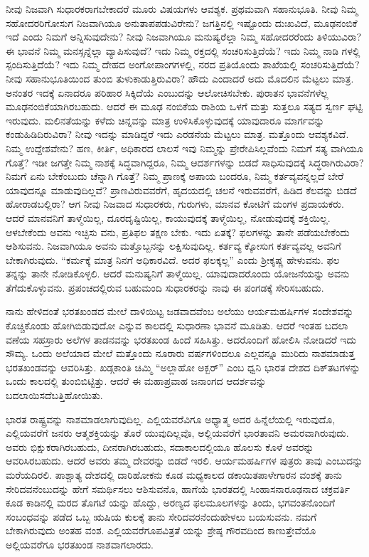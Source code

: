 ನೀವು ನಿಜವಾಗಿ ಸುಧಾರಕರಾಗಬೇಕಾದರೆ ಮೂರು ವಿಷಯಗಳು ಆವಶ್ಯಕ. ಪ್ರಥಮವಾಗಿ ಸಹಾನುಭೂತಿ. ನೀವು ನಿಮ್ಮ ಸಹೋದರರಿಗೋಸುಗ ನಿಜವಾಗಿಯೂ ಅನುತಾಪಪಡುವಿರೇನು? ಜಗತ್ತಿನಲ್ಲಿ ಇಷ್ಟೊಂದು ದುಃಖವಿದೆ, ಮೂಢನಂಬಿಕೆ ಇದೆ ಎಂದು ನಿಮಗೆ ಅನ್ನಿಸುವುದೇನು? ನೀವು ನಿಜವಾಗಿಯೂ ಮನುಷ್ಯರೆಲ್ಲಾ ನಿಮ್ಮ ಸಹೋದರರೆಂದು ತಿಳಿಯುವಿರಾ? ಈ ಭಾವನೆ ನಿಮ್ಮ ಮನಸ್ಸನ್ನೆಲ್ಲಾ ವ್ಯಾಪಿಸುವುದೆ? ಇದು ನಿಮ್ಮ ರಕ್ತದಲ್ಲಿ ಸಂಚರಿಸುತ್ತಿದೆಯೆ? ಇದು ನಿಮ್ಮ ನಾಡಿ ಗಳಲ್ಲಿ ಸ್ಪಂದಿಸುತ್ತಿದೆಯೆ? ಇದು ನಿಮ್ಮ ದೇಹದ ಅಂಗೋಪಾಂಗಗಳಲ್ಲಿ, ನರದ ಪ್ರತಿಯೊಂದು ಶಾಖೆಯಲ್ಲಿ ಸಂಚರಿಸುತ್ತಿದೆಯೆ? ನೀವು ಸಹಾನುಭೂತಿಯಿಂದ ತುಂಬಿ ತುಳುಕಾಡುತ್ತಿರುವಿರಾ? ಹೌದು ಎಂದಾದರೆ ಅದು ಮೊದಲಿನ ಮೆಟ್ಟಲು ಮಾತ್ರ. ಅನಂತರ ಇದಕ್ಕೆ ಏನಾದರೂ ಪರಿಹಾರ ಸಿಕ್ಕಿದೆಯೆ ಎಂಬುದನ್ನು ಆಲೋಚಿಸಬೇಕು. ಪುರಾತನ ಭಾವನೆಗಳೆಲ್ಲ ಮೂಢನಂಬಿಕೆಯಾಗಿರಬಹುದು. ಆದರೆ ಈ ಮೂಢ ನಂಬಿಕೆಯ ರಾಶಿಯ ಒಳಗೆ ಮತ್ತು ಸುತ್ತಲೂ ಸತ್ಯದ ಸ್ವರ್ಣ ಘಟ್ಟಿ ಇರುವುದು. ಮಲಿನತೆಯನ್ನು ಕಳೆದು ಚಿನ್ನವನ್ನು ಮಾತ್ರ ಉಳಿಸಿಕೊಳ್ಳುವುದಕ್ಕೆ ಯಾವುದಾರೂ ಮಾರ್ಗವನ್ನು ಕಂಡುಹಿಡಿದಿರುವಿರಾ? ನೀವು ಇದನ್ನು ಮಾಡಿದ್ದರೆ ಇದು ಎರಡನೆಯ ಮೆಟ್ಟಲು ಮಾತ್ರ. ಮತ್ತೊಂದು ಆವಶ್ಯಕವಿದೆ. ನಿಮ್ಮ ಉದ್ದೇಶವೇನು? ಹಣ, ಕೀರ್ತಿ, ಅಧಿಕಾರದ ಲಾಲಸೆ ಇವು ನಿಮ್ಮನ್ನು ಪ್ರೇರೇಪಿಸಿಲ್ಲವೆಂದು ನಿಮಗೆ ಸತ್ಯ ವಾಗಿಯೂ ಗೊತ್ತೆ? ಇಡೀ ಜಗತ್ತೇ ನಿಮ್ಮ ನಾಶಕ್ಕೆ ಸಿದ್ಧವಾಗಿದ್ದರೂ, ನಿಮ್ಮ ಆದರ್ಶಗಳನ್ನು ಬಿಡದೆ ಸಾಧಿಸುವುದಕ್ಕೆ ಸಿದ್ಧರಾಗಿರುವಿರಾ? ನಿಮಗೆ ಏನು ಬೇಕೆಂಬುದು ಚೆನ್ನಾಗಿ ಗೊತ್ತೆ? ನಿಮ್ಮ ಪ್ರಾಣಕ್ಕೆ ಅಪಾಯ ಬಂದರೂ, ನಿಮ್ಮ ಕರ್ತವ್ಯವನ್ನಲ್ಲದೆ ಬೇರೆ ಯಾವುದನ್ನೂ ಮಾಡುವುದಿಲ್ಲವೆ? ಪ್ರಾಣವಿರುವವರೆಗೆ, ಹೃದಯದಲ್ಲಿ ಚಲನೆ ಇರುವವರೆಗೆ, ಹಿಡಿದ ಕೆಲವನ್ನು ಬಿಡದೆ ಹೋರಾಡಬಲ್ಲಿರಾ? ಆಗ ನೀವು ನಿಜವಾದ ಸುಧಾರಕರು, ಗುರುಗಳು, ಮಾನವ ಕೋಟಿಗೆ ಮಂಗಳ ಪ್ರದಾಯಕರು. ಆದರೆ ಮಾನವನಿಗೆ ತಾಳ್ಮೆಯಿಲ್ಲ, ದೂರದೃಷ್ಟಿಯಿಲ್ಲ, ಕಾಯುವುದಕ್ಕೆ ತಾಳ್ಮೆಯಿಲ್ಲ, ನೋಡುವುದಕ್ಕೆ ಶಕ್ತಿಯಿಲ್ಲ. ಆಳಬೇಕೆಂದು ಅವನು ಇಚ್ಛಿಸು ವನು, ಪ್ರತಿಫಲ ತಕ್ಷಣ ಬೇಕು. ಇದು ಏತಕ್ಕೆ? ಫಲಗಳನ್ನು ತಾನೇ ಪಡೆಯಬೇಕೆಂದು ಆಶಿಸುವನು. ನಿಜವಾಗಿಯೂ ಅವನು ಮತ್ತೊಬ್ಬನನ್ನು ಲಕ್ಷಿಸುವುದಿಲ್ಲ. ಕರ್ತವ್ಯ ಕ್ಕೋಸುಗ ಕರ್ತವ್ಯವಲ್ಲ ಅವನಿಗೆ ಬೇಕಾಗಿರುವುದು. “ಕರ್ಮಕ್ಕೆ ಮಾತ್ರ ನಿನಗೆ ಅಧಿಕಾರವಿದೆ. ಅದರ ಫಲಕ್ಕಲ್ಲ” ಎಂದು ಶ‍್ರೀಕೃಷ್ಣ ಹೇಳುವನು. ಫಲ ತನ್ನನ್ನು ತಾನೇ ನೋಡಿಕೊಳ್ಳಲಿ. ಆದರೆ ಮನುಷ್ಯನಿಗೆ ತಾಳ್ಮೆಯಿಲ್ಲ. ಯಾವುದಾದರೊಂದು ಯೋಜನೆಯನ್ನು ಅವನು ತೆಗೆದುಕೊಳ್ಳುವನು. ಪ್ರಪಂಚದಲ್ಲಿರುವ ಬಹುಮಂದಿ ಸುಧಾರಕರನ್ನು ನಾವು ಈ ಪಂಗಡಕ್ಕೆ ಸೇರಿಸಬಹುದು.

ನಾನು ಹೇಳಿದಂತೆ ಭರತಖಂಡದ ಮೇಲೆ ದಾಳಿಯಿಟ್ಟ ಜಡವಾದವೆಂಬ ಅಲೆಯು ಆರ್ಯಮಹರ್ಷಿಗಳ ಸಂದೇಶವನ್ನು ಕೊಚ್ಚಿಕೊಂಡು ಹೋಗಿಬಿಡುವುದೋ ಎನ್ನುವ ಕಾಲದಲ್ಲಿ ಸುಧಾರಣಾ ಭಾವನೆ ಮೂಡಿತು. ಆದರೆ ಇಂತಹ ಬದಲಾ ವಣೆಯ ಸಹಸ್ರಾರು ಅಲೆಗಳ ತಾಡನವನ್ನು ಭರತಖಂಡ ಹಿಂದೆ ಸಹಿಸಿತ್ತು. ಅದರೊಂದಿಗೆ ಹೋಲಿಸಿ ನೋಡಿದರೆ ಇದು ಸೌಮ್ಯ. ಒಂದು ಅಲೆಯಾದ ಮೇಲೆ ಮತ್ತೊಂದು ನೂರಾರು ವರ್ಷಗಳಿಂದಲೂ ಎಲ್ಲವನ್ನೂ ಮುರಿದು ನಾಶಮಾಡುತ್ತ ಭರತಖಂಡವನ್ನು ಆವರಿಸಿತ್ತು. ಖಡ್ಗಕಾಂತಿ ಚಿಮ್ಮಿ “ಅಲ್ಲಾಹೋ ಅಕ್ಬರ್​” ಎಂಬ ಧ್ವನಿ ಭಾರತ ದೇಶದ ದಿಕ್​ತಟಗಳನ್ನು ಒಂದು ಕಾಲದಲ್ಲಿ ತುಂಬಿಬಿಟ್ಟಿತ್ತು. ಆದರೆ ಈ ಮಹಾಪ್ರವಾಹ ಜನಾಂಗದ ಆದರ್ಶವನ್ನು ಬದಲಾಯಿಸದೆಬತ್ತಿಹೋಯಿತು.

ಭಾರತ ರಾಷ್ಟ್ರವನ್ನು ನಾಶಮಾಡಲಾಗುವುದಿಲ್ಲ. ಎಲ್ಲಿಯವರೆವಿಗೂ ಅಧ್ಯಾತ್ಮ ಅದರ ಹಿನ್ನೆಲೆಯಲ್ಲಿ ಇರುವುದೊ, ಎಲ್ಲಿಯವರೆಗೆ ಜನರು ಆತ್ಮಶಕ್ತಿಯನ್ನು ತೊರೆ ಯುವುದಿಲ್ಲವೊ, ಅಲ್ಲಿಯವರೆಗೆ ಭಾರತಾವನಿ ಅಮರವಾಗಿರುವುದು. ಅವರು ಭಿಕ್ಷುಕರಾಗಿರಬಹುದು, ದೀನರಾಗಿರಬಹುದು, ಸದಾಕಾಲದಲ್ಲಿಯೂ ಹೊಲಸು ಕೊಳೆ ಅವರನ್ನು ಆವರಿಸಿರಬಹುದು. ಆದರೆ ಅವರು ತಮ್ಮ ದೇವರನ್ನು ಬಿಡದೆ ಇರಲಿ. ಆರ್ಯಮಹರ್ಷಿಗಳ ಪುತ್ರರು ತಾವು ಎಂಬುದನ್ನು ಮರೆಯದಿರಲಿ. ಪಾಶ್ಚಾತ್ಯ ದೇಶದಲ್ಲಿ ದಾರಿಹೋಕನು ಕೂಡ ಮಧ್ಯಕಾಲದ ಡಕಾಯಿತಪಾಳೇಗಾರನ ವಂಶಕ್ಕೆ ತಾನು ಸೇರಿದವನೆಂಬುದನ್ನು ಹೇಗೆ ಸಮರ್ಥಿಸಲು ಆಶಿಸುವನೊ, ಹಾಗೆಯೆ ಭಾರತದಲ್ಲಿ ಸಿಂಹಾಸನಾರೂಢನಾದ ಚಕ್ರವರ್ತಿ ಕೂಡ ಕಾಡಿನಲ್ಲಿ ಮರದ ತೊಗಟೆ ಯನ್ನು ಹೊದ್ದು, ಅರಣ್ಯದ ಫಲಮೂಲಗಳನ್ನು ತಿಂದು, ಭಗವಂತನೊಂದಿಗೆ ಸಂಬಂಧವನ್ನು ಪಡೆದ ಒಬ್ಬ ಋಷಿಯ ಕುಲಕ್ಕೆ ತಾನು ಸೇರಿದವರನೆಂದುಹೇಳಲು ಬಯಸುವನು. ನಮಗೆ ಬೇಕಾಗಿರುವುದು ಅಂತಹ ವಂಶ. ಎಲ್ಲಿಯವರೆಗೂಪವಿತ್ರತೆ ಯನ್ನು ಶ್ರೇಷ್ಠ ಗೌರವದಿಂದ ಕಾಣುತ್ತೇವೆಯೊ ಅಲ್ಲಿಯವರೆಗೂ ಭರತಖಂಡ ನಾಶವಾಗಲಾರದು.

